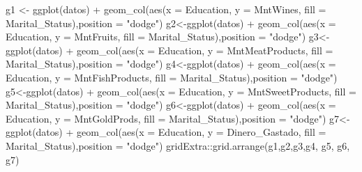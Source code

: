 \documentclass[
]{article}
\newenvironment{Shaded}{\begin{snugshade}}{\end{snugshade}}
\newcommand{\AttributeTok}[1]{\textcolor[rgb]{0.77,0.63,0.00}{#1}}
\newcommand{\FunctionTok}[1]{\textcolor[rgb]{0.00,0.00,0.00}{#1}}
\newcommand{\NormalTok}[1]{#1}
\newcommand{\OtherTok}[1]{\textcolor[rgb]{0.56,0.35,0.01}{#1}}
\newcommand{\SpecialCharTok}[1]{\textcolor[rgb]{0.00,0.00,0.00}{#1}}
\newcommand{\StringTok}[1]{\textcolor[rgb]{0.31,0.60,0.02}{#1}}
\begin{document}
\begin{Shaded}
\begin{Highlighting}[]
\NormalTok{g1 }\OtherTok{\textless{}{-}} \FunctionTok{ggplot}\NormalTok{(datos) }\SpecialCharTok{+}
  \FunctionTok{geom\_col}\NormalTok{(}\FunctionTok{aes}\NormalTok{(}\AttributeTok{x =}\NormalTok{ Education, }\AttributeTok{y =}\NormalTok{ MntWines, }\AttributeTok{fill =}\NormalTok{ Marital\_Status),}\AttributeTok{position =} \StringTok{"dodge"}\NormalTok{)}
\NormalTok{g2}\OtherTok{\textless{}{-}}\FunctionTok{ggplot}\NormalTok{(datos) }\SpecialCharTok{+} 
  \FunctionTok{geom\_col}\NormalTok{(}\FunctionTok{aes}\NormalTok{(}\AttributeTok{x =}\NormalTok{ Education, }\AttributeTok{y =}\NormalTok{ MntFruits, }\AttributeTok{fill =}\NormalTok{ Marital\_Status),}\AttributeTok{position =} \StringTok{"dodge"}\NormalTok{)}
\NormalTok{g3}\OtherTok{\textless{}{-}}\FunctionTok{ggplot}\NormalTok{(datos) }\SpecialCharTok{+} 
  \FunctionTok{geom\_col}\NormalTok{(}\FunctionTok{aes}\NormalTok{(}\AttributeTok{x =}\NormalTok{ Education, }\AttributeTok{y =}\NormalTok{ MntMeatProducts, }\AttributeTok{fill =}\NormalTok{ Marital\_Status),}\AttributeTok{position =} \StringTok{"dodge"}\NormalTok{)}
\NormalTok{g4}\OtherTok{\textless{}{-}}\FunctionTok{ggplot}\NormalTok{(datos) }\SpecialCharTok{+} 
  \FunctionTok{geom\_col}\NormalTok{(}\FunctionTok{aes}\NormalTok{(}\AttributeTok{x =}\NormalTok{ Education, }\AttributeTok{y =}\NormalTok{ MntFishProducts, }\AttributeTok{fill =}\NormalTok{ Marital\_Status),}\AttributeTok{position =} \StringTok{"dodge"}\NormalTok{)}
\NormalTok{g5}\OtherTok{\textless{}{-}}\FunctionTok{ggplot}\NormalTok{(datos) }\SpecialCharTok{+} 
  \FunctionTok{geom\_col}\NormalTok{(}\FunctionTok{aes}\NormalTok{(}\AttributeTok{x =}\NormalTok{ Education, }\AttributeTok{y =}\NormalTok{ MntSweetProducts, }\AttributeTok{fill =}\NormalTok{ Marital\_Status),}\AttributeTok{position =} \StringTok{"dodge"}\NormalTok{)}
\NormalTok{g6}\OtherTok{\textless{}{-}}\FunctionTok{ggplot}\NormalTok{(datos) }\SpecialCharTok{+} 
  \FunctionTok{geom\_col}\NormalTok{(}\FunctionTok{aes}\NormalTok{(}\AttributeTok{x =}\NormalTok{ Education, }\AttributeTok{y =}\NormalTok{ MntGoldProds, }\AttributeTok{fill =}\NormalTok{ Marital\_Status),}\AttributeTok{position =} \StringTok{"dodge"}\NormalTok{)}
\NormalTok{g7}\OtherTok{\textless{}{-}}\FunctionTok{ggplot}\NormalTok{(datos) }\SpecialCharTok{+} 
  \FunctionTok{geom\_col}\NormalTok{(}\FunctionTok{aes}\NormalTok{(}\AttributeTok{x =}\NormalTok{ Education, }\AttributeTok{y =}\NormalTok{ Dinero\_Gastado, }\AttributeTok{fill =}\NormalTok{ Marital\_Status),}\AttributeTok{position =} \StringTok{"dodge"}\NormalTok{)}
\NormalTok{gridExtra}\SpecialCharTok{::}\FunctionTok{grid.arrange}\NormalTok{(g1,g2,g3,g4, g5, g6, g7)}
\end{Highlighting}
\end{Shaded}
\end{document}
